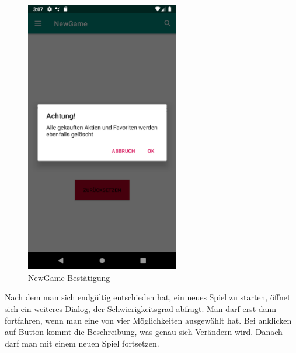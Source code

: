 \documentclass[10pt]{scrartcl}
\begin{document}
\begin{figure}[H]
	\centering
	\includegraphics[width=0.6\textwidth]{Bilder/Applikation/NewGameBestaetigung.png}
	\caption{NewGame Bestätigung}
\end{figure}

Nach dem man sich endgültig entschieden hat, ein neues Spiel zu starten, öffnet sich ein weiteres Dialog, der Schwierigkeitsgrad abfragt. Man darf erst dann fortfahren, wenn man eine von vier Möglichkeiten ausgewählt hat. Bei anklicken auf Button kommt die Beschreibung, was genau sich Verändern wird. Danach darf man mit einem neuen Spiel fortsetzen.
\end{document}
